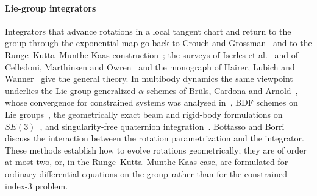\documentclass[preprint,12pt]{elsarticle}
\begin{document}
\paragraph{Lie-group integrators}
Integrators that advance rotations in a local tangent chart and return to the group through the
exponential map go back to Crouch and Grossman~\cite{crouch1993numerical} and to the
Runge--Kutta--Munthe-Kaas construction~\cite{munthe1998lie,munthe1999high}; the surveys of
Iserles et al.~\cite{iserles2000lie} and of Celledoni, Marthinsen and Owren~\cite{celledoni2014lie}
and the monograph of Hairer, Lubich and Wanner~\cite{hairer2006geometric} give the general theory.
In multibody dynamics the same viewpoint underlies the Lie-group generalized-$\alpha$ schemes of
Br\"uls, Cardona and Arnold~\cite{bruls2010lie,bruls2012lie}, whose convergence for constrained
systems was analysed in~\cite{arnold2007convergence,arnold2015error}, BDF schemes on Lie
groups~\cite{wieloch2021bdf}, the geometrically exact beam and rigid-body formulations on
$SE(3)$~\cite{sonneville2014geometrically}, and singularity-free quaternion
integration~\cite{terze2016singularity,terze2020aircraft}. Bottasso and Borri~\cite{bottasso1998integrating}
discuss the interaction between the rotation parametrization and the integrator. These methods
establish how to evolve rotations geometrically; they are of order at most two, or, in the
Runge--Kutta--Munthe-Kaas case, are formulated for ordinary differential equations on the group
rather than for the constrained index-3 problem.
\end{document}
